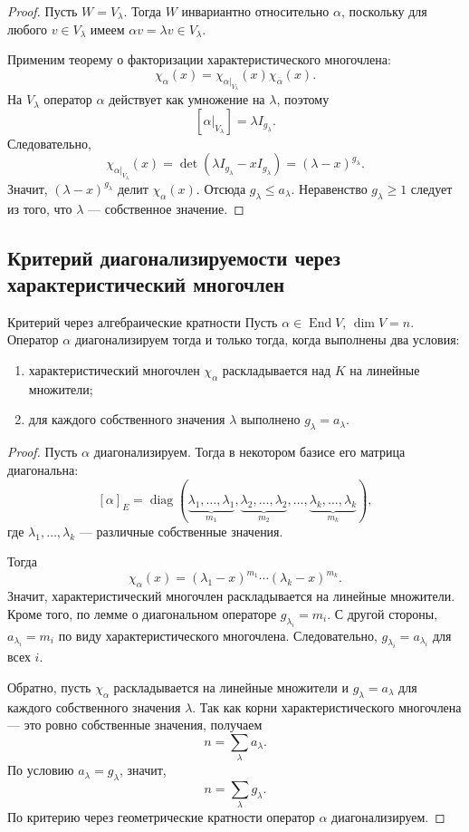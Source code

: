 \begin{proof}
	Пусть $W=V_\lambda$.
	Тогда $W$ инвариантно относительно $\alpha$, поскольку для любого $v\in V_\lambda$
	имеем $\alpha v=\lambda v\in V_\lambda$.
	
	Применим теорему о факторизации характеристического многочлена:
	\[
	\chi_\alpha(x)
	=
	\chi_{\alpha|_{V_\lambda}}(x)\chi_{\overline{\alpha}}(x).
	\]
	На $V_\lambda$ оператор $\alpha$ действует как умножение на $\lambda$, поэтому
	\[
	[\alpha|_{V_\lambda}]=\lambda I_{g_\lambda}.
	\]
	Следовательно,
	\[
	\chi_{\alpha|_{V_\lambda}}(x)
	=
	\det(\lambda I_{g_\lambda}-xI_{g_\lambda})
	=
	(\lambda-x)^{g_\lambda}.
	\]
	Значит, $(\lambda-x)^{g_\lambda}$ делит $\chi_\alpha(x)$.
	Отсюда $g_\lambda\le a_\lambda$.
	Неравенство $g_\lambda\ge 1$ следует из того, что $\lambda$ --- собственное значение.
\end{proof}

\subsection{Критерий диагонализируемости через характеристический многочлен}

\begin{Theorem}{Критерий через алгебраические кратности}{}
	Пусть $\alpha\in\operatorname{End} V$, $\dim V=n$.
	Оператор $\alpha$ диагонализируем тогда и только тогда, когда выполнены два условия:
	
	\begin{enumerate}
		\item характеристический многочлен $\chi_\alpha$ раскладывается над $K$ на линейные множители;
		\item для каждого собственного значения $\lambda$ выполнено $g_\lambda=a_\lambda$.
	\end{enumerate}
\end{Theorem}

\begin{proof}
	Пусть $\alpha$ диагонализируем. Тогда в некотором базисе его матрица диагональна:
	\[
	[\alpha]_E=
	\operatorname{diag}(
	\underbrace{\lambda_1,\ldots,\lambda_1}_{m_1},
	\underbrace{\lambda_2,\ldots,\lambda_2}_{m_2},
	\ldots,
	\underbrace{\lambda_k,\ldots,\lambda_k}_{m_k}
	),
	\]
	где $\lambda_1,\ldots,\lambda_k$ --- различные собственные значения.
	
	Тогда
	\[
	\chi_\alpha(x)
	=
	(\lambda_1-x)^{m_1}\cdots(\lambda_k-x)^{m_k}.
	\]
	Значит, характеристический многочлен раскладывается на линейные множители.
	Кроме того, по лемме о диагональном операторе $g_{\lambda_i}=m_i$.
	С другой стороны, $a_{\lambda_i}=m_i$ по виду характеристического многочлена.
	Следовательно, $g_{\lambda_i}=a_{\lambda_i}$ для всех $i$.
	
	Обратно, пусть $\chi_\alpha$ раскладывается на линейные множители и
	$g_\lambda=a_\lambda$ для каждого собственного значения $\lambda$.
	Так как корни характеристического многочлена --- это ровно собственные значения, получаем
	\[
	n=\sum_{\lambda} a_\lambda.
	\]
	По условию $a_\lambda=g_\lambda$, значит,
	\[
	n=\sum_{\lambda} g_\lambda.
	\]
	По критерию через геометрические кратности оператор $\alpha$ диагонализируем.
\end{proof}

